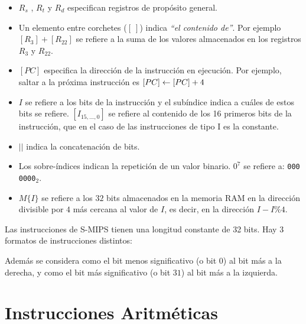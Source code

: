 \documentclass[12pt]{amsart}
\begin{document}
	\begin{itemize}
		\medskip
		\item $R_s$ , $R_t$ y $R_d$ especifican registros de propósito general.
		
		\medskip
		\item Un elemento entre corchetes ($[\ ]$) indica \textit{``el contenido de''}. Por ejemplo $[R_3] + [R_{22}]$ se refiere a la suma de los valores almacenados en los registros $R_3$ y $R_{22}$.
		
		\medskip
		\item $[PC]$ especifica la dirección de la instrucción en ejecución. Por ejemplo, saltar a la próxima instrucción es $[PC] \leftarrow [PC] + 4$
		
		\medskip
		\item $I$ se refiere a los bits de la instrucción y el subíndice indica a cuáles de estos bits se refiere. $[I_{15,...,0}]$ se refiere al contenido de los 16 primeros bits de la instrucción, que en el caso de las instrucciones de tipo I es la constante.
		
		\medskip
		\item $||$ indica la concatenación de bits.
		
		\medskip
		\item Los sobre-índices indican la repetición de un valor binario. $0^7$ se refiere a: \texttt{000 0000}$_2$.
		
		\medskip
		\item $M\{I\}$ se refiere a los $32$ bits almacenados en la memoria RAM en la dirección divisible por $4$ más cercana al valor de $I$, es decir, en la dirección $I - I\%4$.
	\end{itemize}

	Las instrucciones de S-MIPS tienen una longitud constante de 32 bits. Hay 3 formatos de instrucciones	distintos:
	
	
	
	
	Además se considera como el bit menos significativo (o bit $0$) al bit más a la derecha, y como el bit más significativo (o bit $31$) al bit más a la izquierda.
	
	\newpage	
	
	\section{Instrucciones Aritméticas}
	
\end{document}
